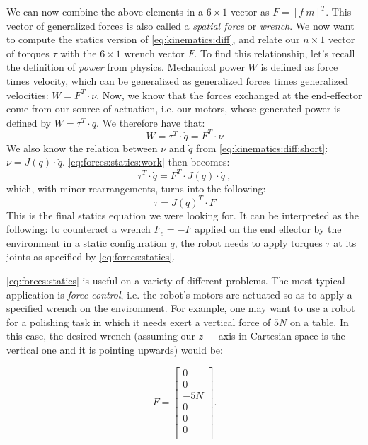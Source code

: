 We can now combine the above elements in a $6\times1$ vector as $F=[f \ m]^T$.
This vector of generalized forces is also called a \textsl{spatial force} or \textsl{wrench}.
We now want to compute the statics version of \cref{eq:kinematics:diff}, and relate our $n \times 1$ vector of torques $\tau$ with the $6\times1$ wrench vector $F$.
To find this relationship, let's recall the definition of \textsl{power} from physics. Mechanical power $W$ is defined as force times velocity, which can be generalized as generalized forces times generalized velocities: $W=F^T \cdot \nu$.
Now, we know that the forces exchanged at the end-effector come from our source of actuation, i.e. our motors, whose generated power is defined by $W=\tau ^T \cdot \dot{q}$. We therefore have that:
\begin{equation}\label{eq:forces:statics:work}
W=\tau ^T \cdot \dot{q} = F^T  \cdot \nu
\end{equation}
We also know the relation between $\nu$ and $\dot{q}$ from \cref{eq:kinematics:diff:short}: $\nu =J(q) \cdot \dot{q}$. \cref{eq:forces:statics:work} then becomes:
\begin{equation}
\tau ^T \cdot \dot{q} = F^T  \cdot J(q) \cdot \dot{q} \ ,
\end{equation}
which, with minor rearrangements, turns into the following:
\begin{equation}\label{eq:forces:statics}
\tau = J(q) ^T \cdot F
\end{equation}
This is the final statics equation we were looking for.
It can be interpreted as the following: to counteract a wrench $F_e = -F$ applied on the end effector by the environment in a static configuration $q$, the robot needs to apply torques $\tau$ at its joints as specified by \cref{eq:forces:statics}.

\cref{eq:forces:statics} is useful on a variety of different problems. The most typical application is \textsl{force control}, i.e. the robot's motors are actuated so as to apply a specified wrench on the environment. For example, one may want to use a robot for a polishing task in which it needs exert a vertical force of $5N$ on a table. In this case, the desired wrench (assuming our $z-$ axis in Cartesian space is the vertical one and it is pointing upwards) would be:

\begin{equation}
F=\left[\begin{array}{c} 0\\ 0\\ -5N\\ 0\\ 0\\ 0\\ \end{array} \right].
\end{equation}



